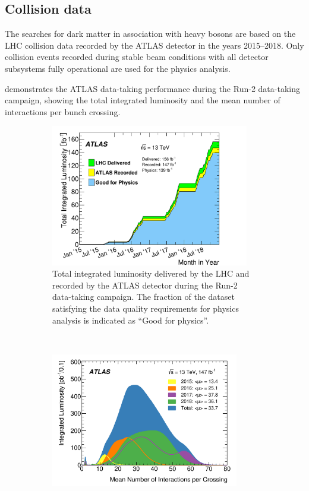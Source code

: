 \subsection{Collision data}
\label{sec:common:data:data}
The searches for dark matter in association with heavy bosons are based on the LHC \HepProcess{\Pp\Pp} collision data recorded by the ATLAS detector in the years 2015--2018. Only collision events recorded during stable beam conditions with all detector subsystems fully operational are used for the physics analysis.

 demonstrates the ATLAS data-taking performance during the Run-2 data-taking campaign, showing the total integrated luminosity and the mean number of interactions per bunch crossing.

\begin{figure}[htbp]
    \centering
    \begin{subfigure}{1.\textwidth}
      \centering
      \includegraphics[width=0.95\textwidth]{figures/common/intlumivstimeRun2DQall.pdf}
      \caption{Total integrated luminosity delivered by the LHC and recorded by the ATLAS detector during the Run-2 \HepProcess{\Pp\Pp} data-taking campaign. The fraction of the dataset satisfying the data quality requirements for physics analysis is indicated as ``Good for physics''.}
    \end{subfigure}
    \\
    \begin{subfigure}{1.\textwidth}
      \centering
      \includegraphics[width=0.9\textwidth]{figures/common/mu_2015_2018.pdf}

\end{subfigure}
\end{figure}
